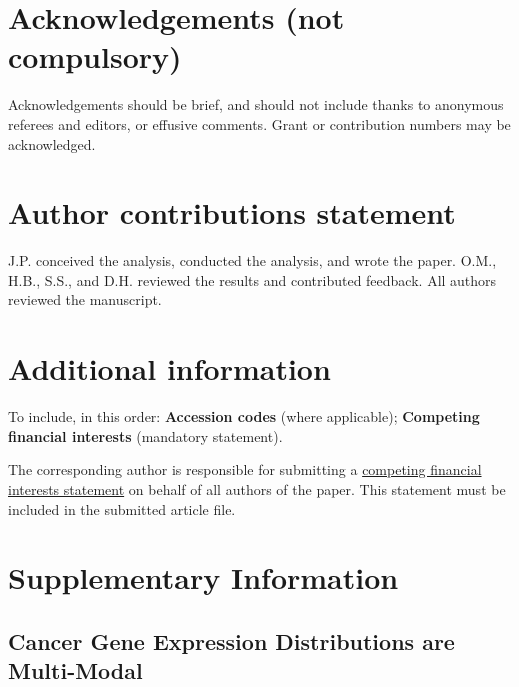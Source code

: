 \documentclass[fleqn,10pt]{wlscirep}
\newcommand{\beginsupplement}{%
        \setcounter{table}{0}
        \renewcommand{\thetable}{S\arabic{table}}%
        \setcounter{figure}{0}
        \renewcommand{\thefigure}{S\arabic{figure}}%
     }
\begin{document}


\section*{Acknowledgements (not compulsory)}

Acknowledgements should be brief, and should not include thanks to anonymous referees and editors, or effusive comments. Grant or contribution numbers may be acknowledged.

\section*{Author contributions statement}

J.P. conceived the analysis, conducted the analysis, and wrote the paper. O.M., H.B., S.S., and D.H. reviewed the results and contributed feedback. All authors reviewed the manuscript. 

\section*{Additional information}

To include, in this order: \textbf{Accession codes} (where applicable); \textbf{Competing financial interests} (mandatory statement). 

The corresponding author is responsible for submitting a \href{http://www.nature.com/srep/policies/index.html#competing}{competing financial interests statement} on behalf of all authors of the paper. This statement must be included in the submitted article file.

\beginsupplement
\section*{Supplementary Information}

\subsection*{Cancer Gene Expression Distributions are Multi-Modal}
\end{document}
